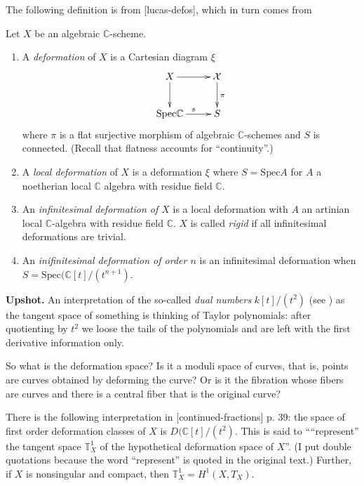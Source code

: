 The following definition is from [lucas-defos], which in turn comes from
\cite{Sernesi-deformations}

\begin{definition}
\label{definition-deformation}
Let $X$ be an algebraic $\mathbb{C}$-scheme.
\begin{enumerate}
\item A {\it deformation} of $X$ is a Cartesian diagram $\xi$
$$
\xymatrix{
X\ar[r]\ar[d]&\mathcal{X}\ar[d]^{\pi}\\
\text{Spec}\mathbb{C}\ar[r]^s&S
}
$$
where $\pi$ is a flat surjective morphism of algebraic $\mathbb{C}$-schemes and
$S$ is connected. (Recall that flatness accounts for ``continuity''.)
\item A {\it local deformation} of $X$ is a deformation $\xi$ where
$S=\text{Spec}A$ for $A$ a noetherian local $\mathbb{C}$ algebra with residue
field $\mathbb{C}$.
\item An {\it infinitesimal deformation of $X$} is a local deformation with $A$
an artinian local $\mathbb{C}$-algebra with residue field $\mathbb{C}$. $X$ is
called {\it rigid} if all infinitesimal deformations are trivial.
\item An {\it inifinitesimal deformation of order $n$} is an infinitesimal
deformation when $S=\text{Spec}(\mathbb{C}[t]/(t^{n+1})$.
\end{enumerate}
\end{definition}

{\bf Upshot.} An interpretation of the so-called {\it dual numbers}
$k[t]/(t^2)$ (see \cite{Hartshorne-deformation}) as the tangent space of
something is thinking of Taylor polynomials: after quotienting by $t^2$ we loose
the tails of the polynomials and are left with the first derivative information
only.

So what is the deformation space? Is it a moduli space of curves, that is,
points are curves obtained by deforming the curve? Or is it the fibration whose
fibers are curves and there is a central fiber that is the original curve?

There is the following interpretation in [continued-fractions] p. 39: the space
of first order deformation classes of $X$ is $D(\mathbb{C}[t]/(t^2)$. This is
said to ````represent'' the tangent space $\mathbb{T}^1_X$ of the hypothetical
deformation space of $X$''. (I put double quotations because the word
``represent'' is quoted in the original text.) Further, if $X$ is nonsingular
and compact, then $\mathbb{T}^1_X=H^{1}(X,T_X)$.


